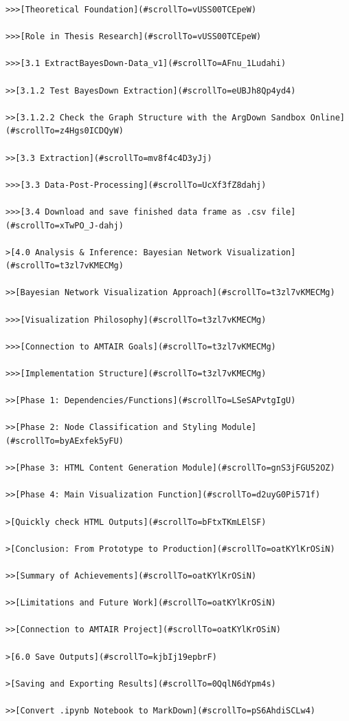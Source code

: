 \documentclass[
  11pt,
  letterpaper,
]{book}
\begin{document}
\begin{verbatim}
>>>[Theoretical Foundation](#scrollTo=vUSS00TCEpeW)

>>>[Role in Thesis Research](#scrollTo=vUSS00TCEpeW)

>>>[3.1 ExtractBayesDown-Data_v1](#scrollTo=AFnu_1Ludahi)

>>[3.1.2 Test BayesDown Extraction](#scrollTo=eUBJh8Qp4yd4)

>>[3.1.2.2 Check the Graph Structure with the ArgDown Sandbox Online](#scrollTo=z4Hgs0ICDQyW)

>>[3.3 Extraction](#scrollTo=mv8f4c4D3yJj)

>>>[3.3 Data-Post-Processing](#scrollTo=UcXf3fZ8dahj)

>>>[3.4 Download and save finished data frame as .csv file](#scrollTo=xTwPO_J-dahj)

>[4.0 Analysis & Inference: Bayesian Network Visualization](#scrollTo=t3zl7vKMECMg)

>>[Bayesian Network Visualization Approach](#scrollTo=t3zl7vKMECMg)

>>>[Visualization Philosophy](#scrollTo=t3zl7vKMECMg)

>>>[Connection to AMTAIR Goals](#scrollTo=t3zl7vKMECMg)

>>>[Implementation Structure](#scrollTo=t3zl7vKMECMg)

>>[Phase 1: Dependencies/Functions](#scrollTo=LSeSAPvtgIgU)

>>[Phase 2: Node Classification and Styling Module](#scrollTo=byAExfek5yFU)

>>[Phase 3: HTML Content Generation Module](#scrollTo=gnS3jFGU52OZ)

>>[Phase 4: Main Visualization Function](#scrollTo=d2uyG0Pi571f)

>[Quickly check HTML Outputs](#scrollTo=bFtxTKmLElSF)

>[Conclusion: From Prototype to Production](#scrollTo=oatKYlKrOSiN)

>>[Summary of Achievements](#scrollTo=oatKYlKrOSiN)

>>[Limitations and Future Work](#scrollTo=oatKYlKrOSiN)

>>[Connection to AMTAIR Project](#scrollTo=oatKYlKrOSiN)

>[6.0 Save Outputs](#scrollTo=kjbIj19epbrF)

>[Saving and Exporting Results](#scrollTo=0QqlN6dYpm4s)

>>[Convert .ipynb Notebook to MarkDown](#scrollTo=pS6AhdiSCLw4)




\end{verbatim}
\end{document}
